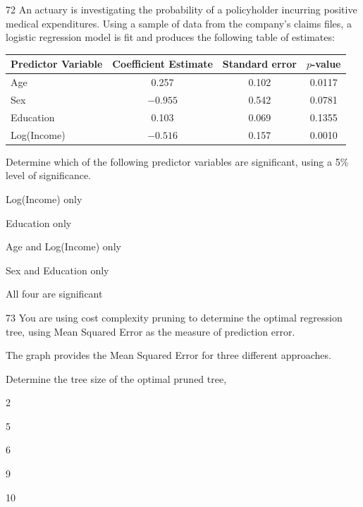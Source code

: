 \begin{question}{72}
An actuary is investigating the probability of a policyholder incurring positive medical expenditures. Using a sample of data from the company's claims files, a logistic regression model is fit and produces the following table of estimates:
\begin{center}
\begin{tabular}{|l|c|c|c|}
\hline
Predictor Variable & Coefficient Estimate & Standard error & $p$-value \\ \hline
Age & 0.257 & 0.102 & 0.0117 \\ \hline
Sex & $-0.955$ & 0.542 & 0.0781 \\ \hline
Education & 0.103 & 0.069 & 0.1355 \\ \hline
Log(Income) & $-0.516$ & 0.157 & 0.0010 \\ \hline
\end{tabular}
\end{center}

Determine which of the following predictor variables are significant, using a 5\% level of significance.

\begin{choices}
\item Log(Income) only
\item Education only
\item Age and Log(Income) only
\item Sex and Education only
\item All four are significant
\end{choices}
\end{question}

\begin{question}{73}
You are using cost complexity pruning to determine the optimal regression tree, using Mean Squared Error as the measure of prediction error.

The graph provides the Mean Squared Error for three different approaches.


Determine the tree size of the optimal pruned tree,

\begin{choices}
\item 2
\item 5
\item 6
\item 9
\item 10
\end{choices}
\end{question}

